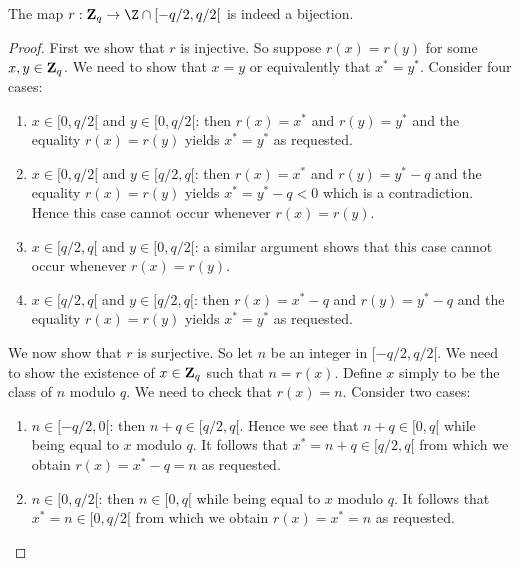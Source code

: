 \documentclass{article}
\newcommand{\zq}{\mbox{${\bf Z}_{q}$}}
\begin{document}
\begin{prop}
  The map $r:\zq\rightarrow\Z\cap[-q/2,q/2[$ is indeed a bijection.
\end{prop}
\begin{proof}
First we show that $r$ is injective. So suppose $r(x)=r(y)$ for some 
$x,y\in\zq$. We need to show that $x=y$ or equivalently that 
$x^{*}=y^{*}$. Consider four cases:
  \begin{enumerate}
    \item $x\in[0,q/2[$ and $y\in[0,q/2[$: then $r(x)=x^{*}$ and $r(y)=y^{*}$
      and the equality $r(x)=r(y)$ yields $x^{*}=y^{*}$ as requested.
    \item $x\in[0,q/2[$ and $y\in[q/2,q[$: then $r(x)=x^{*}$ and 
      $r(y)=y^{*}-q$ and the equality $r(x) = r(y)$ yields $x^{*}=y^{*}-q < 0$
      which is a contradiction. Hence this case cannot occur whenever 
      $r(x)=r(y)$.
    \item $x\in[q/2,q[$ and $y\in[0,q/2[$: a similar argument shows that this
      case cannot occur whenever $r(x)=r(y)$.
    \item $x\in[q/2,q[$ and $y\in[q/2,q[$: then $r(x)=x^{*}-q$ and 
      $r(y)=y^{*}-q$ and the equality $r(x)=r(y)$ yields $x^{*}=y^{*}$ as 
      requested.
  \end{enumerate}
We now show that $r$ is surjective. So let $n$ be an integer in $[-q/2,q/2[$.
  We need to show the existence of $x\in\zq$ such that $n=r(x)$. Define $x$
  simply to be the class of $n$ modulo $q$. We need to check that $r(x)=n$. 
  Consider two cases:
  \begin{enumerate}
    \item $n\in[-q/2,0[$: then $n+q\in[q/2,q[$. Hence we see that $n+q\in[0,q[$
      while being equal to $x$ modulo $q$. It follows that $x^{*}=n+q\in[q/2,q[$
      from which we obtain $r(x) = x^{*} - q = n$ as requested.
    \item $n\in[0,q/2[$: then $n\in[0,q[$ while being equal to $x$ modulo $q$.
      It follows that $x^{*}=n\in[0,q/2[$ from which we obtain $r(x)=x^{*}=n$
      as requested.
  \end{enumerate}
\end{proof}
\end{document}
